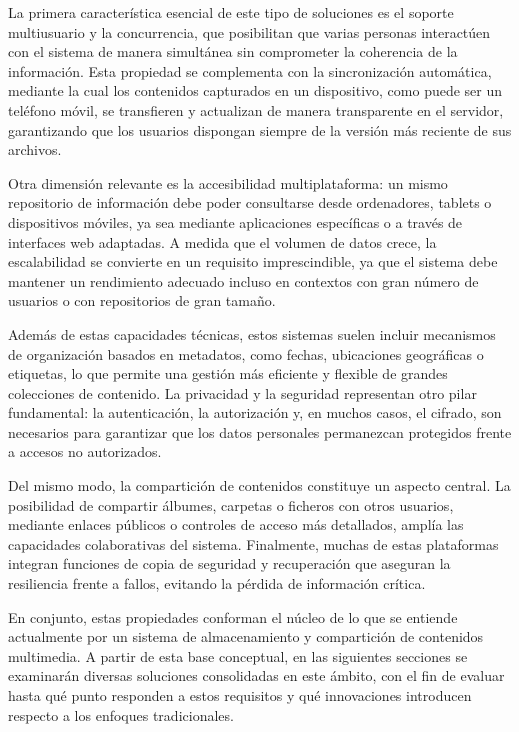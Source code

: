 La primera característica esencial de este tipo de soluciones es el soporte multiusuario y la concurrencia, que posibilitan que varias personas interactúen con el sistema de manera simultánea sin comprometer la coherencia de la información. Esta propiedad se complementa con la sincronización automática, mediante la cual los contenidos capturados en un dispositivo, como puede ser un teléfono móvil, se transfieren y actualizan de manera transparente en el servidor, garantizando que los usuarios dispongan siempre de la versión más reciente de sus archivos.

Otra dimensión relevante es la accesibilidad multiplataforma: un mismo repositorio de información debe poder consultarse desde ordenadores, tablets o dispositivos móviles, ya sea mediante aplicaciones específicas o a través de interfaces web adaptadas. A medida que el volumen de datos crece, la escalabilidad se convierte en un requisito imprescindible, ya que el sistema debe mantener un rendimiento adecuado incluso en contextos con gran número de usuarios o con repositorios de gran tamaño.

Además de estas capacidades técnicas, estos sistemas suelen incluir mecanismos de organización basados en metadatos, como fechas, ubicaciones geográficas o etiquetas, lo que permite una gestión más eficiente y flexible de grandes colecciones de contenido. La privacidad y la seguridad representan otro pilar fundamental: la autenticación, la autorización y, en muchos casos, el cifrado, son necesarios para garantizar que los datos personales permanezcan protegidos frente a accesos no autorizados. 

Del mismo modo, la compartición de contenidos constituye un aspecto central. La posibilidad de compartir álbumes, carpetas o ficheros con otros usuarios, mediante enlaces públicos o controles de acceso más detallados, amplía las capacidades colaborativas del sistema. Finalmente, muchas de estas plataformas integran funciones de copia de seguridad y recuperación que aseguran la resiliencia frente a fallos, evitando la pérdida de información crítica.

En conjunto, estas propiedades conforman el núcleo de lo que se entiende actualmente por un sistema de almacenamiento y compartición de contenidos multimedia. A partir de esta base conceptual, en las siguientes secciones se examinarán diversas soluciones consolidadas en este ámbito, con el fin de evaluar hasta qué punto responden a estos requisitos y qué innovaciones introducen respecto a los enfoques tradicionales.

